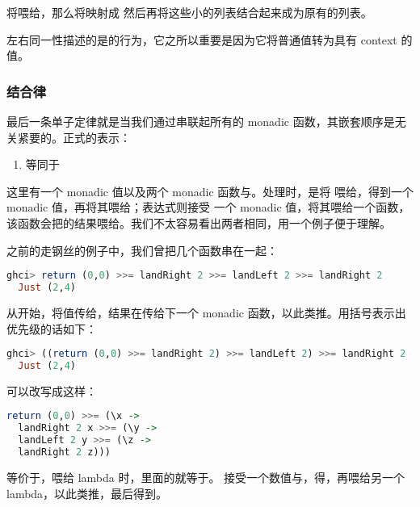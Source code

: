 \documentclass[./main.tex]{subfiles}
\begin{document}
将\acode{[1,2,3,4]}喂给，那么将\acode{[1,2,3,4]}映射成\acode{[[1],[2],[3],[4]]}
然后再将这些小的列表结合起来成为原有的列表。

左右同一性描述的是的行为，它之所以重要是因为它将普通值转为具有 context 的值。

\subsubsection*{结合律}

最后一条单子定律就是当我们通过\acode{>>=}串联起所有的 monadic 函数，其嵌套顺序是无关紧要的。正式的表示：

\begin{enumerate}
  \item {}等同于
\end{enumerate}

这里有一个 monadic 值以及两个 monadic 函数与。处理时，是将
喂给，得到一个 monadic 值，再将其喂给；表达式则接受
一个 monadic 值，将其喂给一个函数，该函数会把的结果喂给。我们不太容易看出两者相同，用一个例子便于理解。

之前的走钢丝的例子中，我们曾把几个函数串在一起：

\begin{lstlisting}[language=Haskell]
  ghci> return (0,0) >>= landRight 2 >>= landLeft 2 >>= landRight 2
  Just (2,4)
\end{lstlisting}

从开始，将值传给，结果在传给下一个 monadic 函数，以此类推。用括号表示出优先级的话如下：

\begin{lstlisting}[language=Haskell]
  ghci> ((return (0,0) >>= landRight 2) >>= landLeft 2) >>= landRight 2
  Just (2,4)
\end{lstlisting}

可以改写成这样：

\begin{lstlisting}[language=Haskell]
  return (0,0) >>= (\x ->
  landRight 2 x >>= (\y ->
  landLeft 2 y >>= (\z ->
  landRight 2 z)))
\end{lstlisting}

等价于，喂给 lambda 时，里面的就等于。
接受一个数值与，得，再喂给另一个 lambda，以此类推，最后得到。
\end{document}
